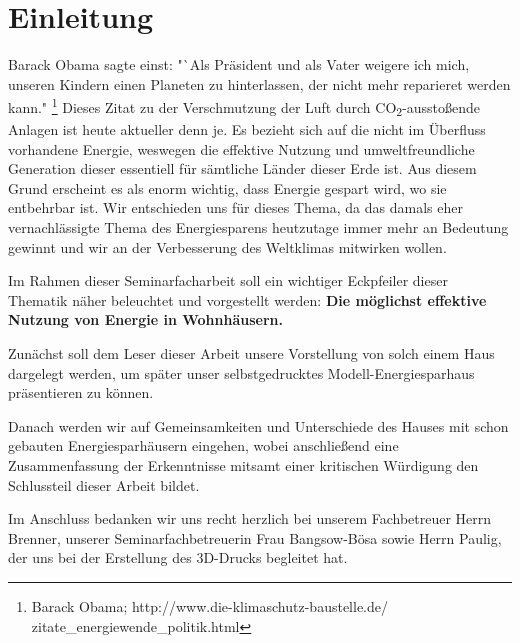 \section{Einleitung}
Barack Obama sagte einst:
"`Als Präsident und als Vater weigere ich mich, unseren Kindern einen Planeten zu hinterlassen,
der nicht mehr reparieret werden kann."
\footnote{Barack Obama; http://www.die-klimaschutz-baustelle.de/
zitate\_energiewende\_politik.html}
Dieses Zitat zu der Verschmutzung der Luft durch CO\textsubscript{2}-ausstoßende Anlagen ist
heute aktueller denn je. Es bezieht sich auf die nicht im Überfluss vorhandene Energie, weswegen
die effektive Nutzung und umweltfreundliche Generation dieser essentiell für sämtliche Länder
dieser Erde ist. Aus diesem Grund erscheint es als enorm wichtig, dass Energie gespart wird, wo
sie entbehrbar ist. Wir entschieden uns für dieses Thema, da das damals eher vernachlässigte
Thema des Energiesparens heutzutage immer mehr an Bedeutung gewinnt und wir an der
Verbesserung des Weltklimas mitwirken wollen.
\par
Im Rahmen dieser Seminarfacharbeit soll ein wichtiger Eckpfeiler dieser Thematik näher
beleuchtet und vorgestellt werden: \textbf{Die möglichst effektive Nutzung von Energie in
Wohnhäusern.}
\par
Zunächst soll dem Leser dieser Arbeit unsere Vorstellung von solch einem Haus dargelegt
werden, um später unser selbstgedrucktes Modell-Energiesparhaus präsentieren zu können.
\par
Danach werden wir auf Gemeinsamkeiten und Unterschiede des Hauses mit schon gebauten
Energiesparhäusern eingehen, wobei anschließend eine Zusammenfassung der Erkenntnisse
mitsamt einer kritischen Würdigung den Schlussteil dieser Arbeit bildet.
\par
Im Anschluss bedanken wir uns recht herzlich bei unserem Fachbetreuer Herrn Brenner, unserer
Seminarfachbetreuerin Frau Bangsow-Bösa sowie Herrn Paulig, der uns bei der Erstellung des 3D-Drucks begleitet hat.
\newpage
